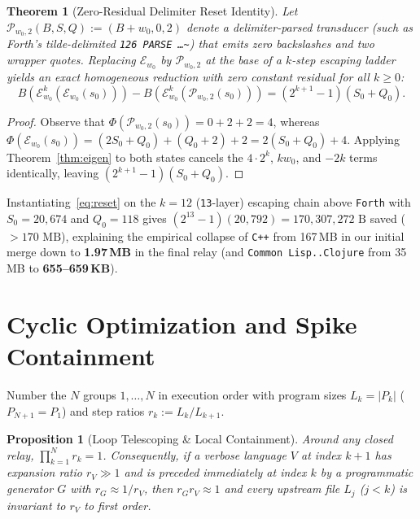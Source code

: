 \documentclass[10pt,twocolumn]{article}
\newtheorem{theorem}{Theorem}
\newtheorem{proposition}{Proposition}
\theoremstyle{definition}
\begin{document}
\begin{theorem}[Zero-Residual Delimiter Reset Identity]
\label{thm:reset}
Let $\mathcal{P}_{w_0, 2}(B, S, Q) := (B + w_0, 0, 2)$ denote a delimiter-parsed transducer (such as Forth's tilde-delimited \texttt{126 PARSE \dots\textasciitilde}) that emits zero backslashes and two wrapper quotes. Replacing $\mathcal{E}_{w_0}$ by $\mathcal{P}_{w_0, 2}$ at the base of a $k$-step escaping ladder yields an exact homogeneous reduction with zero constant residual for all $k \ge 0$:
\begin{equation}
B\!\left(\mathcal{E}_{w_0}^k(\mathcal{E}_{w_0}(s_0))\right) - B\!\left(\mathcal{E}_{w_0}^k(\mathcal{P}_{w_0, 2}(s_0))\right) = (2^{k+1} - 1)(S_0 + Q_0).
\label{eq:reset}
\end{equation}
\end{theorem}
\begin{proof}
Observe that $\Phi(\mathcal{P}_{w_0, 2}(s_0)) = 0 + 2 + 2 = 4$, whereas $\Phi(\mathcal{E}_{w_0}(s_0)) = (2S_0 + Q_0) + (Q_0 + 2) + 2 = 2(S_0 + Q_0) + 4$. Applying Theorem~\ref{thm:eigen} to both states cancels the $4 \cdot 2^k$, $k w_0$, and $-2k$ terms identically, leaving $(2^{k+1} - 1)(S_0 + Q_0)$.
\end{proof}

Instantiating~\eqref{eq:reset} on the $k=12$ (\texttt{13}-layer) escaping chain above \texttt{Forth} with $S_0 = 20{,}674$ and $Q_0 = 118$ gives $(2^{13} - 1)(20{,}792) = 170{,}307{,}272\text{ B}$ saved ($>170\text{ MB}$), explaining the empirical collapse of \texttt{C++} from 167\,MB in our initial merge down to \textbf{1.97\,MB} in the final relay (and \texttt{Common Lisp..Clojure} from 35\,MB to \textbf{655--659\,KB}).

\section{Cyclic Optimization and Spike Containment}
\label{sec:corridor}

Number the $N$ groups $1, \dots, N$ in execution order with program sizes $L_k = |P_k|$ ($P_{N+1} = P_1$) and step ratios $r_k := L_k / L_{k+1}$.

\begin{proposition}[Loop Telescoping \& Local Containment]
\label{prop:loop}
Around any closed relay, $\prod_{k=1}^N r_k = 1$. Consequently, if a verbose language $V$ at index $k+1$ has expansion ratio $r_V \gg 1$ and is preceded immediately at index $k$ by a programmatic generator $G$ with $r_G \approx 1/r_V$, then $r_G r_V \approx 1$ and every upstream file $L_j$ ($j < k$) is invariant to $r_V$ to first order.
\end{proposition}
\end{document}
